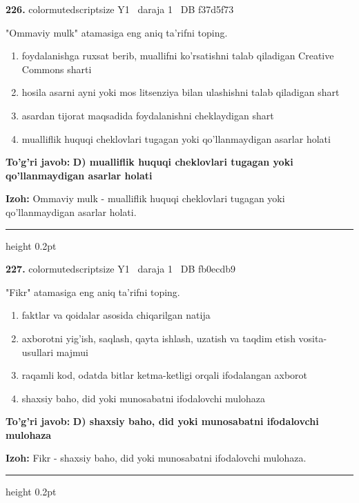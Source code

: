 \documentclass[10pt,a4paper,oneside]{article}
\begin{document}
\noindent\textbf{\color{ink}226.}  {color{muted}scriptsize Y1 \textbullet\ daraja 1 \textbullet\ DB f37d5f73}
\par
"Ommaviy mulk" atamasiga eng aniq ta'rifni toping.
\begin{enumerate}[label=\Alph*),leftmargin=9mm]
\item foydalanishga ruxsat berib, muallifni ko'rsatishni talab qiladigan Creative Commons sharti
\item hosila asarni ayni yoki mos litsenziya bilan ulashishni talab qiladigan shart
\item asardan tijorat maqsadida foydalanishni cheklaydigan shart
\item mualliflik huquqi cheklovlari tugagan yoki qo'llanmaydigan asarlar holati
\end{enumerate}
\begin{tcolorbox}[enhanced,breakable,colback=teal!4,colframe=teal!50!black,boxrule=0.5pt,arc=1.1mm,left=3mm,right=3mm,top=1.7mm,bottom=1.7mm,before skip=2mm,after skip=2mm]
\textbf{\color{teal}To'g'ri javob:} \textbf{D) mualliflik huquqi cheklovlari tugagan yoki qo'llanmaydigan asarlar holati}
\par\smallskip
\textbf{Izoh:} Ommaviy mulk - mualliflik huquqi cheklovlari tugagan yoki qo'llanmaydigan asarlar holati.
\end{tcolorbox}
\vspace{2mm}\hrule height 0.2pt \vspace{3mm}

\noindent\textbf{\color{ink}227.}  {color{muted}scriptsize Y1 \textbullet\ daraja 1 \textbullet\ DB fb0ecdb9}
\par
"Fikr" atamasiga eng aniq ta'rifni toping.
\begin{enumerate}[label=\Alph*),leftmargin=9mm]
\item faktlar va qoidalar asosida chiqarilgan natija
\item axborotni yig'ish, saqlash, qayta ishlash, uzatish va taqdim etish vosita-usullari majmui
\item raqamli kod, odatda bitlar ketma-ketligi orqali ifodalangan axborot
\item shaxsiy baho, did yoki munosabatni ifodalovchi mulohaza
\end{enumerate}
\begin{tcolorbox}[enhanced,breakable,colback=teal!4,colframe=teal!50!black,boxrule=0.5pt,arc=1.1mm,left=3mm,right=3mm,top=1.7mm,bottom=1.7mm,before skip=2mm,after skip=2mm]
\textbf{\color{teal}To'g'ri javob:} \textbf{D) shaxsiy baho, did yoki munosabatni ifodalovchi mulohaza}
\par\smallskip
\textbf{Izoh:} Fikr - shaxsiy baho, did yoki munosabatni ifodalovchi mulohaza.
\end{tcolorbox}
\vspace{2mm}\hrule height 0.2pt \vspace{3mm}
\end{document}
